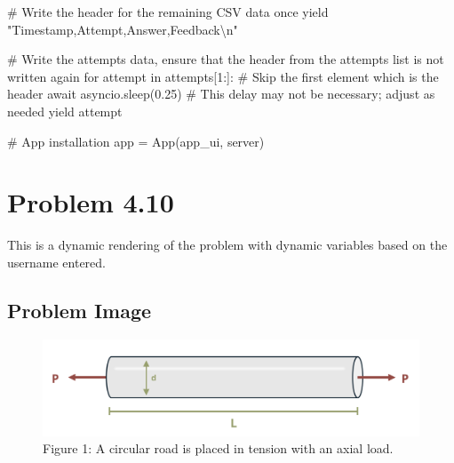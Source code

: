 \documentclass[
  letterpaper,
  DIV=11,
  numbers=noendperiod]{scrreprt}
\newenvironment{Shaded}{\begin{snugshade}}{\end{snugshade}}
\newcommand{\NormalTok}[1]{\textcolor[rgb]{0.00,0.23,0.31}{#1}}
\begin{document}
\begin{Shaded}
\begin{Highlighting}[]
\NormalTok{        \# Write the header for the remaining CSV data once}
\NormalTok{        yield "Timestamp,Attempt,Answer,Feedback\textbackslash{}n"}
        
\NormalTok{        \# Write the attempts data, ensure that the header from the attempts list is not written again}
\NormalTok{        for attempt in attempts[1:]:  \# Skip the first element which is the header}
\NormalTok{            await asyncio.sleep(0.25)  \# This delay may not be necessary; adjust as needed}
\NormalTok{            yield attempt}


\NormalTok{\# App installation}
\NormalTok{app = App(app\_ui, server)}
\end{Highlighting}
\end{Shaded}

\chapter*{Problem 4.10}\label{problem-4.10}


This is a dynamic rendering of the problem with dynamic variables based
on the username entered.

\section*{Problem Image}\label{problem-image-34}


\begin{figure}[H]

{\centering \includegraphics{images/206.png}

}

\caption{Figure 1: A circular road is placed in tension with an axial
load.}

\end{figure}%
\end{document}
